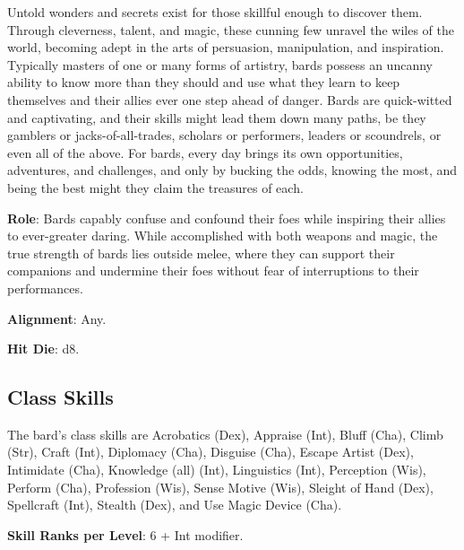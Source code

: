 
\label{f0}				
Untold wonders and secrets exist for those skillful enough to discover them. Through cleverness, talent, and magic, these cunning few unravel the wiles of the world, becoming adept in the arts of persuasion, manipulation, and inspiration. Typically masters of one or many forms of artistry, bards possess an uncanny ability to know more than they should and use what they learn to keep themselves and their allies ever one step ahead of danger. Bards are quick-witted and captivating, and their skills might lead them down many paths, be they gamblers or jacks-of-all-trades, scholars or performers, leaders or scoundrels, or even all of the above. For bards, every day brings its own opportunities, adventures, and challenges, and only by bucking the odds, knowing the most, and being the best might they claim the treasures of each.
				
\textbf{Role}: Bards capably confuse and confound their foes while inspiring their allies to ever-greater daring. While accomplished with both weapons and magic, the true strength of bards lies outside melee, where they can support their companions and undermine their foes without fear of interruptions to their performances.
				
\textbf{Alignment}: Any.
				
\textbf{Hit Die}: d8.
				
\subsection{Class Skills}

				
The bard's class skills are Acrobatics (Dex), Appraise (Int), Bluff (Cha), Climb (Str), Craft (Int), Diplomacy (Cha), Disguise (Cha), Escape Artist (Dex), Intimidate (Cha), Knowledge (all) (Int), Linguistics (Int), Perception (Wis), Perform (Cha), Profession (Wis), Sense Motive (Wis), Sleight of Hand (Dex), Spellcraft (Int), Stealth (Dex), and Use Magic Device (Cha).
				
\textbf{Skill Ranks per Level}: 6 + Int modifier.
								
